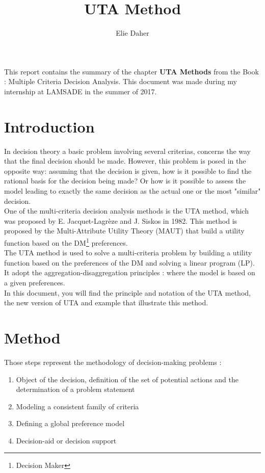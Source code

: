 \documentclass{report}
\title{UTA Method}
\author{Elie Daher}
\begin{document}
\maketitle
\abstract This report contains the summary of the chapter \textbf{UTA Methods} from the Book : Multiple Criteria Decision Analysis. This document was made during my internship at LAMSADE in the summer of 2017.
\tableofcontents{}

\chapter{Introduction}
In decision theory a basic problem involving several criterias, concerns the way that the final decision should be made. However, this problem is posed in the opposite way: assuming that the decision is given, how is it possible to find the rational basis for the decision being made? Or how is it possible to assess the model leading to exactly the same decision as the actual one or the most "similar" decision.\\

One of the multi-criteria decision analysis methods is the UTA method, which was proposed by E. Jacquet-Lagrèze and J. Siskos in 1982. This method is proposed by the Multi-Attribute Utility Theory (MAUT) that build a utility function based on the DM\footnote{Decision Maker} preferences.\\
 
The UTA method is used to solve a multi-criteria problem by building a utility function based on the preferences of the DM and solving a linear program (LP). It adopt the aggregation-disaggregation principles : where the model is based on a given preferences.\\

In this document, you will find the principle and notation of the UTA method, the new version of UTA and example that illustrate this method. 

\chapter{Method}
Those steps represent the methodology of decision-making problems : 
\begin{enumerate}
\item Object of the decision, definition of the set of potential actions and the determination of a problem statement
\item Modeling a consistent family of criteria
\item Defining a global preference model
\item Decision-aid or decision support
\end{enumerate}
\end{document}
